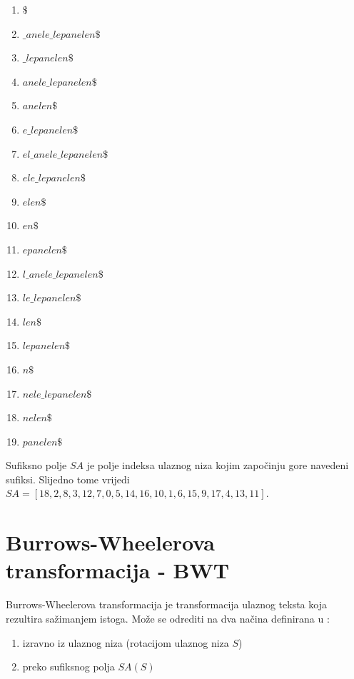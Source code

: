 \documentclass[times, utf8, seminar, numeric]{fer}
\begin{document}
\begin{center}
	\begin{enumerate}
		\setlength\itemsep{-0.8em}
		\item \textbf{$\$$}
		\item \textbf{$\_anele\_lepanelen\$$}
		\item \textbf{$\_lepanelen\$$}
		\item \textbf{$anele\_lepanelen\$$}
		\item \textbf{$anelen\$$}
		\item \textbf{$e\_lepanelen\$$}
		\item \textbf{$el\_anele\_lepanelen\$$}
		\item \textbf{$ele\_lepanelen\$$}
		\item \textbf{$elen\$$}
		\item \textbf{$en\$$}
		\item \textbf{$epanelen\$$}
		\item \textbf{$l\_anele\_lepanelen\$$}
		\item \textbf{$le\_lepanelen\$$}
		\item \textbf{$len\$$}
		\item \textbf{$lepanelen\$$}
		\item \textbf{$n\$$}
		\item \textbf{$nele\_lepanelen\$$}
		\item \textbf{$nelen\$$}
		\item \textbf{$panelen\$$}	
	\end{enumerate} 
\end{center}
Sufiksno polje $SA$ je polje indeksa ulaznog niza kojim započinju gore navedeni sufiksi. Slijedno tome vrijedi 
$SA = [18, 2, 8, 3, 12, 7, 0, 5, 14, 16, 10, 1, 6, 15, 9, 17, 4, 13, 11]$.\cite{Beller2011}

\section {Burrows-Wheelerova transformacija - BWT}
Burrows-Wheelerova transformacija je transformacija ulaznog teksta koja rezultira sažimanjem istoga. Može se odrediti na dva načina definirana u \cite{domazet_sikic_skripta}: 
 
\begin{center}
	\begin{enumerate}
		\setlength\itemsep{-0.8em}
		\item {izravno iz ulaznog niza (rotacijom ulaznog niza $S$)}
		\item {preko sufiksnog polja $SA(S)$}

	\end{enumerate} 
\end{center}
\end{document}
